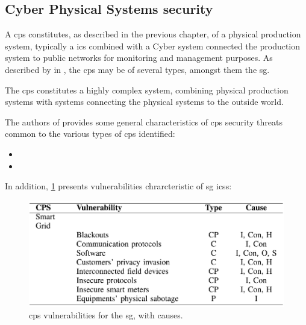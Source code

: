 \subsection{Cyber Physical Systems security}

A \acrfull{cps} constitutes, as described in the previous chapter, of a physical production system, typically a \acrfull{ics} combined with a Cyber system connected the production system to public networks for monitoring and management purposes. As described by \citeauthor{humayed2017cyber} in \cite{humayed2017cyber}, the \acrshort{cps} may be of several types, amongst them the \acrshort{sg}.

The \acrshort{cps} constitutes a highly complex system,  combining physical production systems with systems connecting the physical systems to the outside world.\  

The authors of \cite{humayed2017cyber} provides some general characteristics of \acrshort{cps} security threats common to the various types of \acrshort{cps} identified:



\begin{itemize}
    \item 
    \item  
\end{itemize}




In addition, \figureautorefname{ }  \ref{fig:CP-Vulnerabilities-SG.png} presents vulnerabilities chrarcteristic of \acrshort{sg} \acrshort{ics}s:


\begin{figure}[ht]
\includegraphics[width=\linewidth]{figures/CP-Vulnerabilities-SG.png}
\caption[\acrlong{cps} vulnerabilities for the \acrlong{sg}]{\acrlong{cps} vulnerabilities for the \acrlong{sg}, with causes. \cite[p. 1809]{humayed2017cyber}}
\label{fig:CP-Vulnerabilities-SG.png}
\end{figure}

